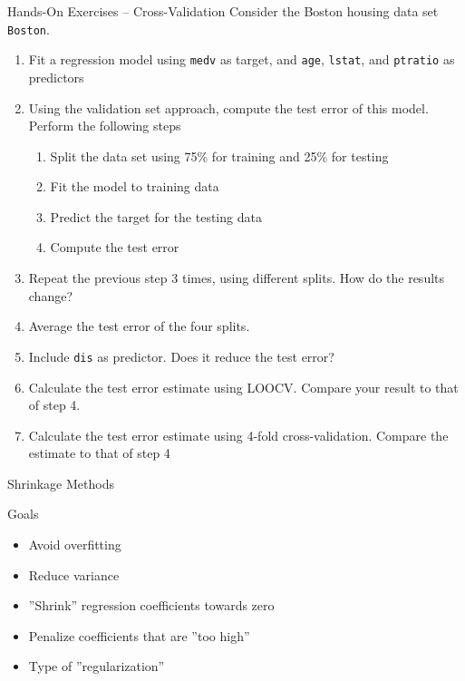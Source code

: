 \documentclass[ignorenonframetext,xcolor=x11names]{beamer}
\begin{document}
\begin{frame}{Hands-On Exercises -- Cross-Validation}
Consider the Boston housing data set \texttt{Boston}.
\begin{enumerate}
  \item Fit a regression model using \texttt{medv} as target, and \texttt{age}, \texttt{lstat}, and \texttt{ptratio} as predictors
  \item Using the validation set approach, compute the test error of this model. Perform the following steps
  \begin{enumerate}
     \item Split the data set using 75\% for training and 25\% for testing
     \item Fit the model to training data
     \item Predict the target for the testing data
     \item Compute the test error
  \end{enumerate}
  \item Repeat the previous step 3 times, using different splits. How do the results change?
  \item Average the test error of the four splits. 
  \item Include \texttt{dis} as predictor. Does it reduce the test error?
  \item Calculate the test error estimate using LOOCV. Compare your result to that of step 4.
  \item Calculate the test error estimate using 4-fold cross-validation. Compare the estimate to that of step 4
\end{enumerate}
\end{frame}

\begin{frame}{Shrinkage Methods}
\begin{block}{Goals}
\begin{itemize}
   \item Avoid overfitting
   \item Reduce variance
   \item ''Shrink'' regression coefficients towards zero
   \item Penalize coefficients that are ''too high''
   \item Type of ''regularization''
\end{itemize}
\end{block}
\end{frame}
\end{document}
